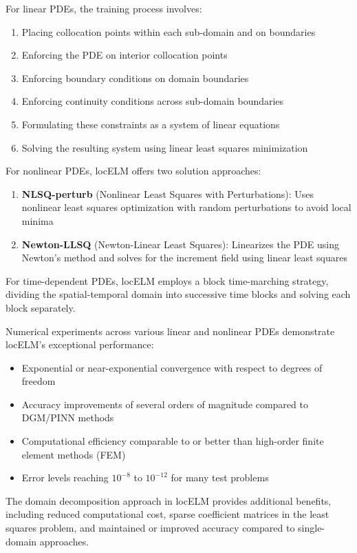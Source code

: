 \documentclass[11pt]{article}
\begin{document}
For linear PDEs, the training process involves:
\begin{enumerate}
    \item Placing collocation points within each sub-domain and on boundaries
    \item Enforcing the PDE on interior collocation points
    \item Enforcing boundary conditions on domain boundaries
    \item Enforcing continuity conditions across sub-domain boundaries
    \item Formulating these constraints as a system of linear equations
    \item Solving the resulting system using linear least squares minimization
\end{enumerate}

For nonlinear PDEs, locELM offers two solution approaches:
\begin{enumerate}
    \item \textbf{NLSQ-perturb} (Nonlinear Least Squares with Perturbations): Uses nonlinear least squares optimization with random perturbations to avoid local minima
    \item \textbf{Newton-LLSQ} (Newton-Linear Least Squares): Linearizes the PDE using Newton's method and solves for the increment field using linear least squares
\end{enumerate}

For time-dependent PDEs, locELM employs a block time-marching strategy, dividing the spatial-temporal domain into successive time blocks and solving each block separately.

Numerical experiments across various linear and nonlinear PDEs demonstrate locELM's exceptional performance:
\begin{itemize}
    \item Exponential or near-exponential convergence with respect to degrees of freedom
    \item Accuracy improvements of several orders of magnitude compared to DGM/PINN methods
    \item Computational efficiency comparable to or better than high-order finite element methods (FEM)
    \item Error levels reaching $10^{-8}$ to $10^{-12}$ for many test problems
\end{itemize}

The domain decomposition approach in locELM provides additional benefits, including reduced computational cost, sparse coefficient matrices in the least squares problem, and maintained or improved accuracy compared to single-domain approaches.
\end{document}
